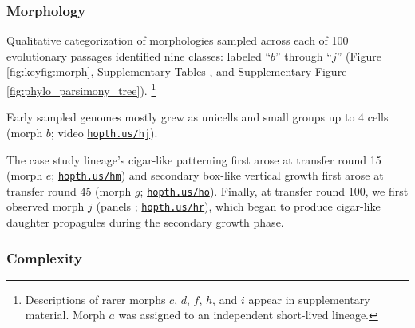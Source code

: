 

\subsubsection{Morphology}


Qualitative categorization of morphologies sampled across each of 100 evolutionary passages
identified nine classes: labeled ``$b$'' through ``$j$'' (Figure \ref{fig:keyfig:morph}, Supplementary Tables , and Supplementary Figure \ref{fig:phylo_parsimony_tree}).
\unskip\footnote{%
Descriptions of rarer morphs $c$, $d$, $f$, $h$, and $i$ appear in supplementary material.
Morph $a$ was assigned to an independent short-lived lineage.
}

Early sampled genomes mostly grew as unicells and small groups up to 4 cells (morph $b$; video \href{https://hopth.us/hj}{\texttt{hopth.us/hj}}).

The case study lineage's cigar-like patterning first arose at transfer round 15 (morph $e$; \href{https://hopth.us/hm}{\texttt{hopth.us/hm}}) and
secondary box-like vertical growth first arose at transfer round 45 (morph $g$; \href{https://hopth.us/ho}{\texttt{hopth.us/ho}}).
Finally, at transfer round 100, we first observed morph $j$ (panels ; \href{https://hopth.us/hr}{\texttt{hopth.us/hr}}), which began to produce cigar-like daughter propagules during the secondary growth phase.

\subsubsection{Complexity}

